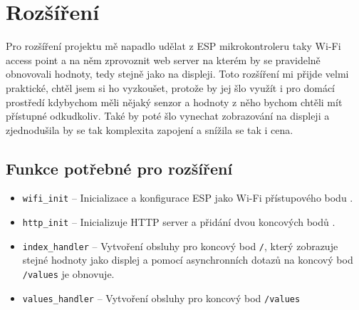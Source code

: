 \section{Rozšíření}
Pro rozšíření projektu mě napadlo udělat z ESP mikrokontroleru taky Wi-Fi access point a na něm zprovoznit web server na kterém by se pravidelně obnovovali hodnoty, tedy stejně jako na displeji. Toto rozšíření mi přijde velmi praktické, chtěl jsem si ho vyzkoušet, protože by jej šlo využít i pro domácí prostředí kdybychom měli nějaký senzor a hodnoty z něho bychom chtěli mít přístupné odkudkoliv. Také by poté šlo vynechat zobrazování na displeji a zjednodušila by se tak komplexita zapojení a snížila se tak i cena.

\subsection{Funkce potřebné pro rozšíření}
\begin{itemize}[itemsep=0pt]
    \item \texttt{wifi\_init} -- Inicializace a konfigurace ESP jako Wi-Fi přístupového bodu \cite{setup-esp-as-AP}.
    \item \texttt{http\_init} -- Inicializuje HTTP server a přidání dvou koncových bodů \cite{http-server-setup}. 
    \item \texttt{index\_handler} -- Vytvoření obsluhy pro koncový bod \texttt{/}, který zobrazuje stejné hodnoty jako displej a pomocí asynchronních dotazů na koncový bod \texttt{/values} je obnovuje.
    \item \texttt{values\_handler} -- Vytvoření obsluhy pro koncový bod \texttt{/values}
\end{itemize}
